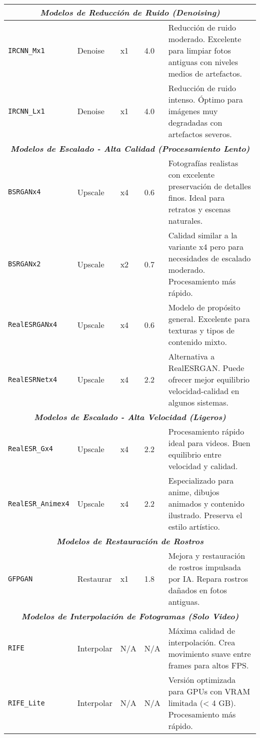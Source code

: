 \documentclass[11pt, a4paper]{article}
\begin{document}
\begin{longtable}{p{2.8cm} p{1.8cm} p{1.2cm} p{1.5cm} p{7.2cm}}
\multicolumn{5}{c}{\textit{\textbf{Modelos de Reducción de Ruido (Denoising)}}} \\
\midrule
\texttt{IRCNN\_Mx1} & Denoise & x1 & 4.0 & Reducción de ruido moderado. Excelente para limpiar fotos antiguas con niveles medios de artefactos. \\
\texttt{IRCNN\_Lx1} & Denoise & x1 & 4.0 & Reducción de ruido intenso. Óptimo para imágenes muy degradadas con artefactos severos. \\
\midrule
\multicolumn{5}{c}{\textit{\textbf{Modelos de Escalado - Alta Calidad (Procesamiento Lento)}}} \\
\midrule
\texttt{BSRGANx4} & Upscale & x4 & 0.6 & Fotografías realistas con excelente preservación de detalles finos. Ideal para retratos y escenas naturales. \\
\texttt{BSRGANx2} & Upscale & x2 & 0.7 & Calidad similar a la variante x4 pero para necesidades de escalado moderado. Procesamiento más rápido. \\
\texttt{RealESRGANx4} & Upscale & x4 & 0.6 & Modelo de propósito general. Excelente para texturas y tipos de contenido mixto. \\
\texttt{RealESRNetx4} & Upscale & x4 & 2.2 & Alternativa a RealESRGAN. Puede ofrecer mejor equilibrio velocidad-calidad en algunos sistemas. \\
\midrule
\multicolumn{5}{c}{\textit{\textbf{Modelos de Escalado - Alta Velocidad (Ligeros)}}} \\
\midrule
\texttt{RealESR\_Gx4} & Upscale & x4 & 2.2 & Procesamiento rápido ideal para videos. Buen equilibrio entre velocidad y calidad. \\
\texttt{RealESR\_Animex4} & Upscale & x4 & 2.2 & Especializado para anime, dibujos animados y contenido ilustrado. Preserva el estilo artístico. \\
\midrule
\multicolumn{5}{c}{\textit{\textbf{Modelos de Restauración de Rostros}}} \\
\midrule
\texttt{GFPGAN} & Restaurar & x1 & 1.8 & Mejora y restauración de rostros impulsada por IA. Repara rostros dañados en fotos antiguas. \\
\midrule
\multicolumn{5}{c}{\textit{\textbf{Modelos de Interpolación de Fotogramas (Solo Video)}}} \\
\midrule
\texttt{RIFE} & Interpolar & N/A & N/A & Máxima calidad de interpolación. Crea movimiento suave entre frames para altos FPS. \\
\texttt{RIFE\_Lite} & Interpolar & N/A & N/A & Versión optimizada para GPUs con VRAM limitada (< 4 GB). Procesamiento más rápido. \\

\end{longtable}
\end{document}
